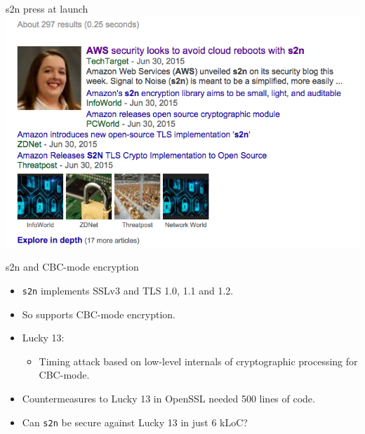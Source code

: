 \documentclass[presentation,smaller]{beamer}
\begin{document}
\begin{frame}[label={sec:orgheadline2}]{s2n press at launch}
\includegraphics[width=.9\linewidth]{./s2n-eurocrypt-press.png}
\end{frame}

\begin{frame}[fragile,label={sec:orgheadline3}]{s2n and CBC-mode encryption}
 \begin{itemize}
\item \texttt{s2n} implements SSLv3 and TLS 1.0, 1.1 and 1.2.

\item So supports CBC-mode encryption.

\item Lucky 13:

\begin{itemize}
\item Timing attack based on low-level internals of cryptographic processing for CBC-mode.
\end{itemize}

\item Countermeasures to Lucky 13 in OpenSSL needed 500 lines of code.

\item Can \texttt{s2n} be secure against Lucky 13 in just 6 kLoC?
\end{itemize}
\end{frame}
\end{document}
